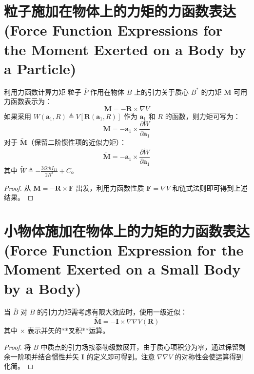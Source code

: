 \section{粒子施加在物体上的力矩的力函数表达 (Force Function Expressions for the Moment Exerted on a Body by a Particle)}

\begin{myTheorem}{利用力函数计算力矩}
粒子 \(\overline{P}\) 作用在物体 \(B\) 上的引力关于质心 \(B^*\) 的力矩 \(\mathbf{M}\) 可用力函数表示为：
\begin{equation}
\mathbf{M} = -\mathbf{R}\times\nabla V \tag{1}
\end{equation}
如果采用 \(W(\mathbf{a}_1,R) \triangleq V[\mathbf{R}(\mathbf{a}_1,R)]\) 作为 \(\mathbf{a}_1\) 和 \(R\) 的函数，则力矩可写为：
\begin{equation}
\mathbf{M} = -\mathbf{a}_1\times\frac{\partial W}{\partial\mathbf{a}_1} \tag{2}
\end{equation}
对于 \(\widetilde{\mathbf{M}}\)（保留二阶惯性项的近似力矩）：
\begin{equation}
\widetilde{\mathbf{M}} = -\mathbf{a}_1\times\frac{\partial\widetilde{W}}{\partial\mathbf{a}_1} \tag{4}
\end{equation}
其中 \(\widetilde{W} \triangleq -\frac{3G\overline{m}I_{11}}{2R^3} + C\)。
\end{myTheorem}
\begin{proof}
从 \(\mathbf{M} = -\mathbf{R}\times\mathbf{F}\) 出发，利用力函数性质 \(\mathbf{F} = \nabla V\) 和链式法则即可得到上述结果。
\end{proof}

\section{小物体施加在物体上的力矩的力函数表达 (Force Function Expression for the Moment Exerted on a Small Body by a Body)}

当 \(\overline{B}\) 对 \(B\) 的引力力矩需考虑有限大效应时，使用一级近似：
\begin{equation}
\widetilde{\mathbf{M}} = -\mathbf{I} \times \nabla\nabla V(\mathbf{R}) \tag{1}
\end{equation}
其中 \(\times\) 表示并矢的**叉积**运算。
\begin{proof}
将 \(B\) 中质点的引力场按泰勒级数展开，由于质心项积分为零，通过保留剩余一阶项并结合惯性并矢 \(\mathbf{I}\) 的定义即可得到。注意 \(\nabla\nabla V\) 的对称性会使运算得到化简。
\end{proof}